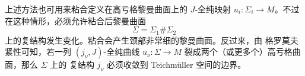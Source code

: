 \begin{remark}\label{rem:10-5-6}
上述方法也可用来粘合定义在高亏格黎曼曲面上的 $J$-全纯映射
$u_i:\Sigma_i\to M$。不过在这种情形，必须允许粘合后黎曼曲面
\[
  \Sigma=\Sigma_1\#\Sigma_2
\]
上的复结构发生变化。粘合会产生颈部非常细的黎曼曲面。反过来，由
格罗莫夫紧性可知，若一列 $(j_\nu,J)$-全纯曲线
$u_\nu:\Sigma\to M$ 裂成两个（或更多个）高亏格曲面，那么 $\Sigma$ 上的
复结构 $j_\nu$ 必须收敛到 Teichmüller 空间的边界。
\end{remark}
